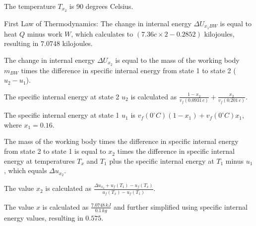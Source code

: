 The temperature \( T_{x_2} \) is 90 degrees Celsius.

First Law of Thermodynamics:
The change in internal energy \( \Delta U_{x_1 BW} \) is equal to heat \( Q \) minus work \( W \), which calculates to \( (7.36c \times 2 - 0.2852) \) kilojoules, resulting in \( 7.0748 \) kilojoules.

The change in internal energy \( \Delta U_{x_2} \) is equal to the mass of the working body \( m_{BW} \) times the difference in specific internal energy from state 1 to state 2 (\( u_2 - u_1 \)).

The specific internal energy at state 2 \( u_2 \) is calculated as \( \frac{1 - x_2}{v_f (0.0931 \, c)} + \frac{x_2}{v_f (0.201 \, c)} \).

The specific internal energy at state 1 \( u_1 \) is \( v_f (0^\circ C) (1 - x_1) + v_f (0^\circ C) x_1 \), where \( x_1 = 0.16 \).

The mass of the working body times the difference in specific internal energy from state 2 to state 1 is equal to \( x_2 \) times the difference in specific internal energy at temperatures \( T_x \) and \( T_1 \) plus the specific internal energy at \( T_1 \) minus \( u_1 \), which equals \( \Delta u_{x_2} \).

The value \( x_2 \) is calculated as \( \frac{\Delta u_{x_2} + u_f (T_1) - u_f (T_x)}{u_f (T_x) - u_f (T_1)} \).

The value \( x \) is calculated as \( \frac{7.0748 \, kJ}{0.1 \, kg} \) and further simplified using specific internal energy values, resulting in \( 0.575 \).